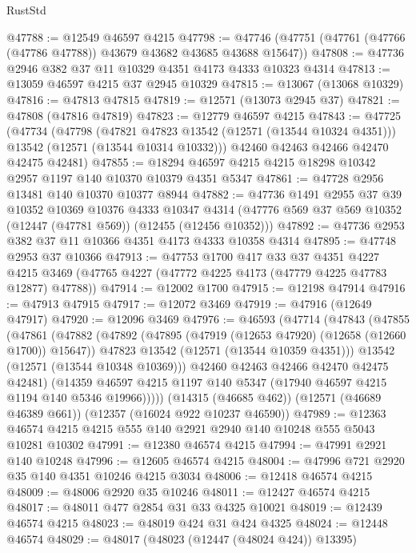 \begin{lexlean}{RustStd}
\begin{coremodule}
@47788 := @12549 @46597 @4215
@47798 := @47746 (@47751 (@47761 (@47766 (@47786 @47788)) @43679 @43682 @43685 @43688 @15647))
@47808 := @47736 @2946 @382 @37 @11 @10329 @4351 @4173 @4333 @10323 @4314
@47813 := @13059 @46597 @4215 @37 @2945 @10329
@47815 := @13067 (@13068 @10329)
@47816 := @47813 @47815
@47819 := @12571 (@13073 @2945 @37)
@47821 := @47808 (@47816 @47819)
@47823 := @12779 @46597 @4215
@47843 := @47725
    (@47734
      (@47798
        (@47821 @47823 @13542 (@12571 (@13544 @10324 @4351)))
        @13542
        (@12571 (@13544 @10314 @10332)))
      @42460
      @42463
      @42466
      @42470
      @42475
      @42481)
@47855 := @18294 @46597 @4215 @4215 @18298 @10342 @2957 @1197 @140 @10370 @10379 @4351 @5347
@47861 := @47728 @2956 @13481 @140 @10370 @10377 @8944
@47882 := @47736
    @1491
    @2955
    @37
    @39
    @10352
    @10369
    @10376
    @4333
    @10347
    @4314
    (@47776 @569 @37 @569 @10352 (@12447 (@47781 @569)) (@12455 (@12456 @10352)))
@47892 := @47736 @2953 @382 @37 @11 @10366 @4351 @4173 @4333 @10358 @4314
@47895 := @47748 @2953 @37 @10366
@47913 := @47753
    @1700
    @417
    @33
    @37
    @4351
    @4227
    @4215
    @3469
    (@47765 @4227 (@47772 @4225 @4173 (@47779 @4225 @47783 @12877) @47788))
@47914 := @12002 @1700
@47915 := @12198 @47914
@47916 := @47913 @47915
@47917 := @12072 @3469
@47919 := @47916 (@12649 @47917)
@47920 := @12096 @3469
@47976 := @46593
    (@47714
      (@47843
        (@47855
          (@47861
            (@47882
              (@47892
                (@47895 (@47919 (@12653 @47920) (@12658 (@12660 @1700)) @15647))
                @47823
                @13542
                (@12571 (@13544 @10359 @4351)))
              @13542
              (@12571 (@13544 @10348 @10369)))
            @42460
            @42463
            @42466
            @42470
            @42475
            @42481)
          (@14359 @46597 @4215 @1197 @140 @5347 (@17940 @46597 @4215 @1194 @140 @5346 @19966)))))
    (@14315 (@46685 @462))
    (@12571 (@46689 @46389 @661))
    (@12357 (@16024 @922 @10237 @46590))
@47989 := @12363 @46574 @4215 @4215 @555 @140 @2921 @2940 @140 @10248 @555 @5043 @10281 @10302
@47991 := @12380 @46574 @4215
@47994 := @47991 @2921 @140 @10248
@47996 := @12605 @46574 @4215
@48004 := @47996 @721 @2920 @35 @140 @4351 @10246 @4215 @3034
@48006 := @12418 @46574 @4215
@48009 := @48006 @2920 @35 @10246
@48011 := @12427 @46574 @4215
@48017 := @48011 @477 @2854 @31 @33 @4325 @10021
@48019 := @12439 @46574 @4215
@48023 := @48019 @424 @31 @424 @4325
@48024 := @12448 @46574
@48029 := @48017 (@48023 (@12447 (@48024 @424)) @13395)

\end{coremodule}
\end{lexlean}
